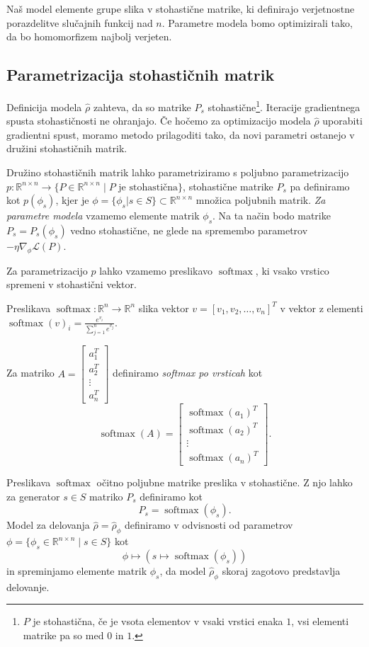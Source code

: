 \documentclass[mat2, tisk]{fmfdelo}
\newcommand{\R}{\mathbb R}
\newcommand{\loss}{\mathcal L}
\begin{document}
Naš model elemente grupe slika v stohastične matrike,
ki definirajo verjetnostne porazdelitve slučajnih
funkcij nad $n$. Parametre modela bomo optimizirali
tako, da bo homomorfizem najbolj verjeten.
\subsection{Parametrizacija stohastičnih matrik}
\label{section:parametrizacija stohastičnih matrik}
Definicija modela $\hat  \rho$ zahteva, da so matrike
$P_s$ stohastične\footnote{$P$ je stohastična, če je
  vsota elementov v vsaki vrstici enaka $1$, vsi elementi
matrike pa so med $0$ in $1$.}. Iteracije gradientnega
spusta stohastičnosti ne ohranjajo. Če hočemo za
optimizacijo modela $\hat \rho$ uporabiti gradientni
spust, moramo metodo prilagoditi tako, da novi
parametri ostanejo v družini stohastičnih matrik.

Družino stohastičnih matrik lahko parametriziramo s
poljubno parametrizacijo $p \colon \R^{n \times n} \to
\{P \in \R^{n \times n} \mid P \text{ je stohastična}\}$,
stohastične matrike $P_s$ pa definiramo kot
$p(\phi_s)$, kjer je $\phi = \{\phi_s | s\in S \}
\subset \R^{n \times n}$ množica poljubnih matrik.
\emph{Za parametre modela} vzamemo elemente matrik
$\phi_s$. Na ta način bodo matrike $P_s = P_s(\phi_s)$
vedno stohastične, ne glede na spremembo parametrov
$-\eta \nabla_\phi \loss(P)$.

Za parametrizacijo $p$ lahko vzamemo preslikavo
$\operatorname{softmax}$, ki vsako vrstico spremeni v
stohastični vektor.
\begin{definicija}
  \label{def:softmax}
  Preslikava $\operatorname{softmax} \colon \R^n \to
  \R^n$ slika vektor $v = [v_1, v_2, \dotsc, v_n]^T$ v
  vektor z elementi $\operatorname{softmax}(v)_i =
  \frac{e^{v_i}}{\sum_{j = 1}^n e^{v_j}}$.

  Za matriko $A =
  \begin{bmatrix}
    a_1^T \\
    a_2^T \\
    \vdots \\
    a_n^T
  \end{bmatrix}$ definiramo \emph{softmax po vrsticah} kot
  $$\operatorname{softmax}(A) =
  \begin{bmatrix}
    \operatorname{softmax}(a_1)^T \\
    \operatorname{softmax}(a_2)^T \\
    \vdots \\
    \operatorname{softmax}(a_n)^T
  \end{bmatrix}.$$
\end{definicija}
Preslikava $\operatorname{softmax}$ očitno poljubne
matrike preslika v stohastične. Z njo lahko za
generator $s \in S$ matriko $P_s$ definiramo kot
$$
P_s = \operatorname{softmax}(\phi_s).
$$
Model za delovanja $\hat \rho = \hat \rho_\phi$
definiramo v odvisnosti od parametrov $\phi = \{\phi_s
\in \R^{n \times n } \mid s \in S\}$ kot
$$
\phi \mapsto ( s \mapsto \operatorname{softmax}(\phi_s))
$$
in spreminjamo elemente matrik $ \phi_s$, da model
$\hat \rho_\phi$ skoraj zagotovo predstavlja delovanje.
%
\end{document}
